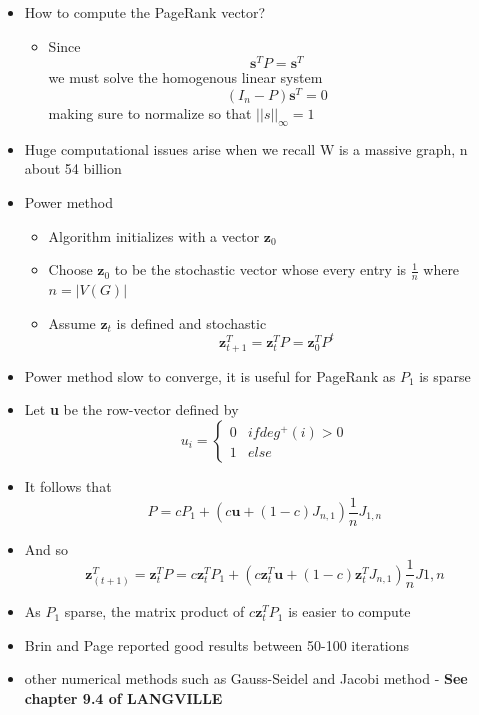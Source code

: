 \documentclass[11pt]{report}
\begin{document}
\begin{itemize}
\item How to compute the PageRank vector?
\begin{itemize}
\item Since \begin{equation} \textbf{s}^T P = \textbf{s}^T\end{equation} we must solve the homogenous linear system \begin{equation}(I_n-P)\textbf{s}^T=0\end{equation} making sure to normalize so that \(||s||_\infty =1\)
\end{itemize}
\item Huge computational issues arise when we recall W is a massive graph, n about 54 billion
\item Power method
\begin{itemize}
\item Algorithm initializes with a vector $\textbf{z}_0$
\item Choose $\textbf{z}_0$ to be the stochastic vector whose every entry is $\frac{1}{n}$ where \(n=|V(G)|\)
\item Assume $\textbf{z}_t$ is defined and stochastic
\begin{equation}
\textbf{z}_{t+1}^T = \textbf{z}_{t}^TP = \textbf{z}_{0}^TP^t
\end{equation}
\end{itemize}
\item Power method slow to converge, it is useful for PageRank as $P_1$ is sparse
\item Let \textbf{u} be the row-vector defined by \begin{equation} u_i =\begin{cases} 0& if deg^+(i) >0 \\ 1 & else\end{cases}\end{equation}
\item It follows that \begin{equation}P=cP_1 +(c\textbf{u} +(1-c)J_{n,1})\frac{1}{n}J_{1,n}\end{equation}
\item And so \begin{equation}
\textbf{z}^T_{(t+1)} = \textbf{z}_t^TP=c\textbf{z}^T_tP_1 +(c\textbf{z}^T_t\textbf{u} +(1-c)\textbf{z}^T_tJ_{n,1})\frac{1}{n}J{1,n}
\end{equation}
\item As $P_1$ sparse, the matrix product of $c\textbf{z}^T_tP_1$ is easier to compute
\item Brin and Page reported good results between 50-100 iterations
\item other numerical methods such as Gauss-Seidel and Jacobi method - \textbf{See chapter 9.4 of LANGVILLE}
\end{itemize}
\end{document}
